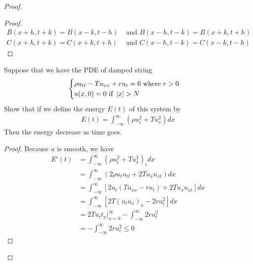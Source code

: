 \documentclass{report}
\begin{document}
\begin{proof}
\begin{proof}
\begin{align*}
B(x+h,t+k)=B(x-k,t-h)&\text{ and }B(x-h,t-k)=B(x+k,t+h)\\
C(x+h,t+k)=C(x+k,t+h)&\text{ and }C(x-h,t-k)=C(x-k,t-h)
\end{align*}
\end{proof}
\begin{question}{}{}
Suppose that we have the PDE of damped string 
\begin{align*}
  \begin{cases}    
\rho u_{tt}-T u_{xx}+ru_t=0\text{ where }r>0\\
u(x,0)=0 \text{ if }\abso{x}>N
  \end{cases}
\end{align*}
Show that if we define the energy $E(t)$ of this system by 
\begin{align*}
E(t)=\int_{-\infty}^{\infty} (\rho u_t^2 + Tu_x^2)dx
\end{align*}
Then the energy decrease as time goes. 
\end{question}
\begin{proof}
Because $u$ is smooth, we have 
\begin{align*}
E'(t)&=\int_{-\infty}^{\infty} (\rho u_t^2+Tu_x^2)_tdx\\
&=\int_{-\infty}^{\infty} (2\rho u_tu_{tt}+2Tu_xu_{xt})dx\\
&=\int_{-\infty}^{\infty} [2u_t(Tu_{xx}-ru_t)+2Tu_xu_{xt}]dx\\
&=\int_{-\infty}^{\infty} [2T(u_tu_x)_x-2ru_t^2]dx \\
&=2Tu_tt_x\Big|_{x=0}^{\infty} - \int_{-\infty}^{\infty} 2ru_t^2\\
&=- \int_{-\infty}^{\infty} 2ru_t^2\leq  0
\end{align*}
\end{proof}


\end{proof}
\end{document}
